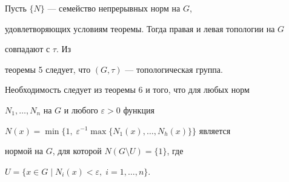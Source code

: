  


\begin{pf} Пусть $\{N\}$ --- семейство непрерывных норм на $G$, 


удовлетворяющих условиям теоремы. Тогда правая и левая топологии на $G$ 


совпадают с $\tau$. Из 


теоремы 5 следует, что $(G,\tau)$ --- топологическая группа. 


 


Необходимость следует из теоремы 6 и того, что для любых норм 


$N_1,\dotsc,N_n$ на $G$ и любого $\varepsilon>0$ функция 


$N(x)=\min\{1,\;\varepsilon^{-1}\max\{N_1(x),\dotsc,N_h(x)\}\}$ является 


нормой на $G$, для которой $N(G\setminus U)=\{1\}$, где 


$U=\{x\in G\mid N_i(x)<\varepsilon,\;i=1,\dotsc,n\}$.


\end{pf} 


 


